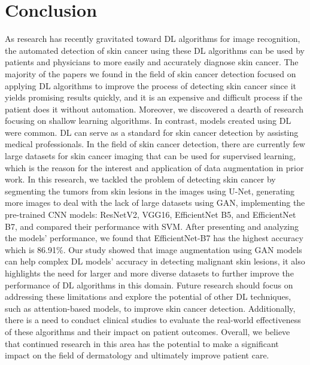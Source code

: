 \documentclass[12pt]{diazessay}
\begin{document}
    \section{Conclusion}
    \hspace{0.7cm} As research has recently gravitated toward DL algorithms for image recognition, the automated detection of skin cancer using these DL algorithms can be used by patients and physicians to more easily and accurately diagnose skin cancer. 
    The majority of the papers we found in the field of skin cancer detection focused on applying DL algorithms to improve the process of detecting skin cancer since it yields promising results quickly, and it is an expensive and difficult process if the patient does it without automation. Moreover, we discovered a dearth of research focusing on shallow learning algorithms. In contrast, models created using DL were common. DL can serve as a standard for skin cancer detection by assisting medical professionals.
    In the field of skin cancer detection, there are currently few large datasets for skin cancer imaging that can be used for supervised learning, which is the reason for the interest and application of data augmentation in prior work.
    In this research, we tackled the problem of detecting skin cancer by segmenting the tumors from skin lesions in the images using U-Net, generating more images to deal with the lack of large datasets using GAN,  implementing the pre-trained CNN models: ResNetV2, VGG16, EfficientNet B5, and EfficientNet B7, and compared their performance with SVM. After presenting and analyzing the models’ performance, we found that EfficientNet-B7 has the highest accuracy which is 86.91\%. 
    Our study showed that image augmentation using GAN models can help complex DL models' accuracy in detecting malignant skin lesions, it also highlights the need for larger and more diverse datasets to further improve the performance of DL algorithms in this domain. Future research should focus on addressing these limitations and explore the potential of other DL techniques, such as attention-based models, to improve skin cancer detection. Additionally, there is a need to conduct clinical studies to evaluate the real-world effectiveness of these algorithms and their impact on patient outcomes. Overall, we believe that continued research in this area has the potential to make a significant impact on the field of dermatology and ultimately improve patient care.


    \newpage
    
    
\end{document}
